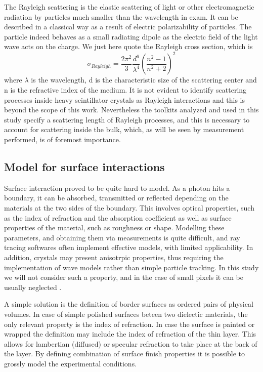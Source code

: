 The Rayleigh scattering is the elastic scattering of light or other electromagnetic radiation by particles much smaller than the wavelength in exam.
It can be described in a classical way as a result of electric polarizability of particles.
The particle indeed behaves as a small radiating dipole as the electric field of the light wave acts on the charge. We just here quote the Rayleigh cross section, which is 
\begin{equation}
\sigma _{Rayleigh} = \frac{2\pi ^{2}}{3} \frac{d^{6}}{\lambda ^{4}}\left( \frac{n^{2}-1}{n^{2}+2} \right) ^{2}
\end{equation}
where $\lambda$ is the wavelength, d is the characteristic size of the scattering center and n is the refractive index of the medium.
It is not evident to identify scattering processes inside heavy scintillator crystals as Rayleigh interactions and this is beyond the scope of this work. Nevertheless the toolkits analyzed and used in this study specify a scattering length of Rayleigh processes, and this is necessary to account for scattering inside the bulk, which, as will be seen by measurement performed, is of foremost importance.

\subsection{Model for surface interactions}
Surface interaction proved to be quite hard to model. As a photon hits a boundary, it can be absorbed, transmitted or reflected depending on the  materials at the two sides of the boundary. This involves optical properties, such as the index of refraction and the absorption coefficient as well as surface properties of the material, such as roughness or shape.
Modelling these parameters, and obtaining them via measurements is quite difficult, and ray tracing softwares often implement effective models, with limited applicability.
In addition, crystals may present anisotrpic properties, thus requiring the implementation of wave models rather than simple particle tracking.
In this study we will not consider such a property, and in the case of small pixels it can be usually neglected \cite{Cuccia2013}.

A simple solution is the definition of border surfaces as ordered pairs of physical volumes. In case of simple polished surfaces beteen two dielectic materials, the only relevant property is the index of refraction.
In case the surface is painted or wrapped the definition may include the index of refraction of the thin layer. This allows for lambertian (diffused) or specular refraction to take place at the back of the layer. By defining combination of surface finish properties it is possible to grossly model the experimental conditions.

